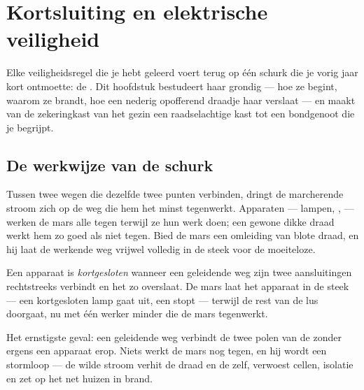 \chapter{Kortsluiting en elektrische veiligheid}\label{ch:g7:short-circuits-safety}

Elke veiligheidsregel die je hebt geleerd voert terug op één schurk die
je vorig jaar kort ontmoette: de . Dit hoofdstuk bestudeert
haar grondig --- hoe ze begint, waarom ze brandt, hoe een nederig
opofferend draadje haar verslaat --- en maakt van de zekeringkast van
het gezin een raadselachtige kast tot een bondgenoot die je begrijpt.

\section{De werkwijze van de schurk}

\begin{proposition}\label{prop:g7:short-circuits-safety:effortless}
Tussen twee wegen die dezelfde twee punten verbinden, dringt de
marcherende stroom zich op de weg die hem het minst tegenwerkt.
Apparaten --- lampen, ,  --- werken de mars alle tegen
terwijl ze hun werk doen; een gewone dikke draad werkt hem zo goed als
niet tegen. Bied de mars een omleiding van blote draad, en hij laat de
werkende weg vrijwel volledig in de steek voor de moeiteloze.
\end{proposition}

\begin{definition}\label{def:g7:short-circuits-safety:device}
Een apparaat is \emph{kortgesloten} wanneer een
geleidende weg zijn twee aansluitingen rechtstreeks verbindt en het
zo overslaat. De mars laat het apparaat in de steek --- een
kortgesloten lamp gaat uit, een  stopt --- terwijl de rest van
de lus doorgaat, nu met één werker minder die de mars tegenwerkt.
\end{definition}

\begin{definition}\label{def:g7:short-circuits-safety:battery}
Het ernstigste geval: een geleidende weg verbindt de twee
polen van de \emph{} zonder ergens een apparaat erop.
Niets werkt de mars nog tegen, en hij wordt een stormloop --- de wilde
stroom verhit de draad en de  zelf, verwoest cellen,
 isolatie en zet op het net huizen in brand.
\end{definition}

